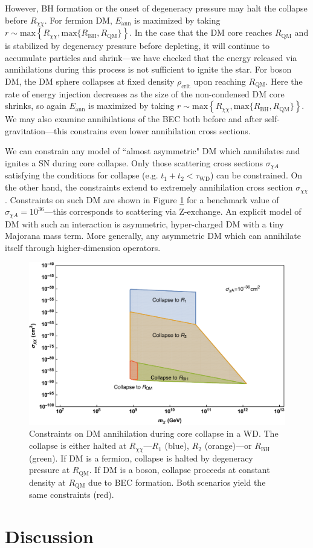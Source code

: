 \documentclass[preprintnumbers,amsmath,amssymb,prd,superscriptaddress]{revtex4}
\begin{document}
However, BH formation or the onset of degeneracy pressure may halt the collapse before $R_{\chi \chi}$. 
For fermion DM, $E_\text{ann}$ is maximized by taking $r \sim \text{max}\left \{R_{\chi \chi}, \text{max}\{R_\text{BH}, R_\text{QM}\} \right \}$. 
In the case that the DM core reaches $R_\text{QM}$ and is stabilized by degeneracy pressure before depleting, it will continue to accumulate particles and shrink---we have checked that the energy released via annihilations during this process is not sufficient to ignite the star. 
For boson DM, the DM sphere collapses at fixed density $\rho_\text{crit}$ upon reaching $R_\text{QM}$. 
Here the rate of energy injection decreases as the size of the non-condensed DM core shrinks, so again $E_\text{ann}$ is maximized by taking $r \sim \text{max}\left \{R_{\chi \chi}, \text{max}\{R_\text{BH}, R_\text{QM}\} \right \}$.
We may also examine annihilations of the BEC both before and after self-gravitation---this constrains even lower annihilation cross sections.

We can constrain any model of ``almost asymmetric" DM which annihilates and ignites a SN during core collapse.
Only those scattering cross sections $\sigma_{\chi A}$ satisfying the conditions for collapse (e.g. $t_1 +t_2 <\tau_\text{WD}$) can be constrained. 
On the other hand, the constraints extend to extremely annihilation cross section $\sigma_{\chi \chi}$.
Constraints on such DM are shown in Figure \ref{fig:annbur} for a benchmark value of $\sigma_{\chi A} = 10^{36}$---this corresponds to scattering via Z-exchange. 
An explicit model of DM with such an interaction is asymmetric, hyper-charged DM with a tiny Majorana mass term. 
More generally, any asymmetric DM which can annihilate itself through higher-dimension operators. 

\begin{figure}
\centering
\includegraphics[scale=0.5]{annbur}
\caption{Constraints on DM annihilation during core collapse in a WD.
The collapse is either halted at $R_{\chi \chi}$---$R_1$ (blue), $R_2$ (orange)---or $R_\text{BH}$ (green).
If DM is a fermion, collapse is halted by degeneracy pressure at $R_\text{QM}$. 
If DM is a boson, collapse proceeds at constant density at $R_\text{QM}$ due to BEC formation.
Both scenarios yield the same constraints (red).}
\label{fig:annbur}
\end{figure}

\section{Discussion}
\end{document}
